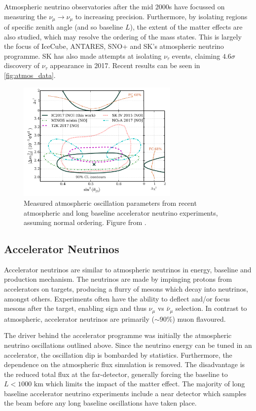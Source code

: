 Atmospheric neutrino observatories after the mid 2000s have focussed on measuring the $\nu_\mu\rightarrow\nu_\mu$ to increasing precision. Furthermore, by isolating regions of specific zenith angle (and so baseline $L$), the extent of the matter effects are also studied, which may resolve the ordering of the mass states. This is largely the focus of IceCube\cite{icecube}, ANTARES\cite{antares}, SNO+ and SK's atmospheric neutrino programme. SK has also made attempts at isolating $\nu_\tau$ events\cite{superk_tau}, claiming $4.6\sigma$ discovery of $\nu_\tau$ appearance in 2017. Recent results can be seen in \autoref{fig:atmos_data}.
\begin{figure}[h]
	\includegraphics[width=0.7\textwidth, trim={0mm 0mm 0mm 0mm}, clip,page=1]{figures/theory/icecube_comp}
	\caption{Measured atmospheric oscillation parameters from recent atmospheric and long baseline accelerator neutrino experiments, assuming normal ordering. Figure from \cite{icecube}.}
	\label{fig:atmos_data}
\end{figure}

\subsection{Accelerator Neutrinos}
Accelerator neutrinos are similar to atmospheric neutrinos in energy, baseline and production mechanism. The neutrinos are made by impinging protons from accelerators on targets, producing a flurry of mesons which decay into neutrinos, amongst others. Experiments often have the ability to deflect and/or focus mesons after the target, enabling sign and thus $\nu_\mu$ vs $\bar{\nu}_\mu$ selection. In contrast to atmospheric, accelerator neutrinos are primarily ($\sim90\%$) muon flavoured.

The driver behind the accelerator programme was initially the atmospheric neutrino oscillations outlined above. Since the neutrino energy can be tuned in an accelerator, the oscillation dip is bombarded by statistics. Furthermore, the dependence on the atmospheric flux simulation is removed\cite{lbnl_review}. The disadvantage is the reduced total flux at the far-detector, generally forcing the baseline to $L<1000\text{ km}$ which limits the impact of the matter effect. The majority of long baseline accelerator neutrino experiments include a near detector which samples the beam before any long baseline oscillations have taken place.

